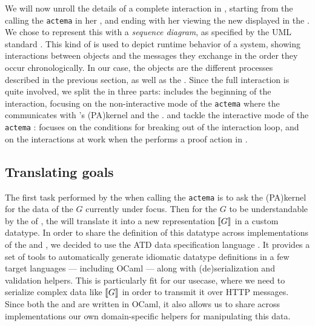 We will now unroll the details of a complete interaction in ,
starting from the  calling the \texttt{actema}  in her
, and ending with her viewing the new  displayed in the
. We chose to represent this with a \emph{sequence diagram}, as
specified by the UML standard \cite{enwiki:1153944336}. This kind of  is
used to depict runtime behavior of a system, showing interactions between
objects and the messages they exchange in the order they occur chronologically.
In our case, the objects are the different processes described in the previous
section, as well as the . Since the full interaction is quite
involved, we split the  in three parts:  includes the
beginning of the interaction, focusing on the non-interactive mode of the
\texttt{actema}  where the  communicates with 's
\kl(PA){kernel} and the .  and
 tackle the interactive mode of the \texttt{actema} :
 focuses on the conditions for breaking out of the interaction
loop, and  on the interactions at work when the 
performs a proof action in .

\subsection{Translating goals}

The first task performed by the  when calling the
\texttt{actema}  is to ask the \kl(PA){kernel} for the data of the  $G$
currently under focus. Then for the  $G$ to be understandable by the
 of , the  will translate it into a new
representation $\llbracket G \rrbracket$ in a custom datatype. In order to share the
definition of this datatype across implementations of the  and
, we decided to use the ATD data specification language
\cite{ATD}. It provides a set of tools to automatically generate idiomatic
datatype definitions in a few target languages --- including OCaml --- along
with (de)serialization and validation helpers. This is particularly fit for our
usecase, where we need to serialize complex data like $\llbracket G \rrbracket$ in order to
transmit it over HTTP messages. Since both the  and
 are written in OCaml, it also allows us to share across
implementations our own domain-specific helpers for manipulating this data.

